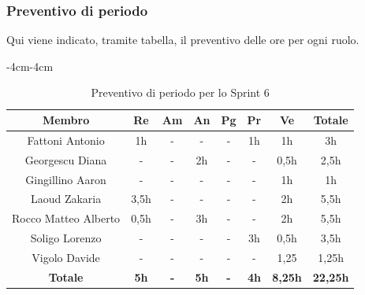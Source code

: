 \documentclass[a4paper,12pt]{article}
\begin{document}
\subsubsection{Preventivo di periodo}
Qui viene indicato, tramite tabella, il preventivo delle ore per ogni ruolo.
\begin{table}[H]
    \begin{adjustwidth}{-4cm}{-4cm}
    \centering
    \begin{tabular}{|c|c|c|c|c|c|c|c|}
        \hline
        \textbf{Membro}& \textbf{Re} & \textbf{Am} & \textbf{An} & \textbf{Pg} & \textbf{Pr} & \textbf{Ve} & \textbf{Totale} \\
        \hline
        Fattoni Antonio & 1h & - & - & - & 1h & 1h & 3h \\
        \hline
        Georgescu Diana & - & - & 2h & - & - & 0,5h & 2,5h \\
        \hline
        Gingillino Aaron & - & - & - & - & - & 1h & 1h \\
        \hline
        Laoud Zakaria & 3,5h & - & - & - & - & 2h & 5,5h \\
        \hline
        Rocco Matteo Alberto & 0,5h & - & 3h & - & - & 2h & 5,5h \\
        \hline
        Soligo Lorenzo & - & - & - & - & 3h & 0,5h & 3,5h \\
        \hline
        Vigolo Davide & - & - & - & - & - & 1,25 & 1,25h \\
        \hline
        \textbf{Totale} & \textbf{5h} & \textbf{-} & \textbf{5h} & \textbf{-} & \textbf{4h} & \textbf{8,25h} & \textbf{22,25h} \\
        \hline
    \end{tabular}
    \caption{Preventivo di periodo per lo Sprint 6}
    \end{adjustwidth}
\end{table}
\end{document}

